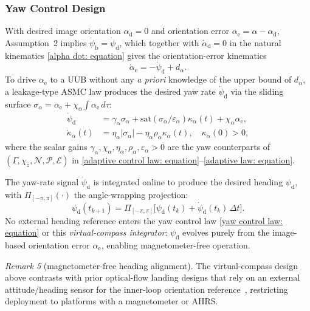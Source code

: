 \documentclass{IEEEtaes}
\begin{document}
\subsubsection{Yaw Control Design} \label{yaw control: section}
With desired image orientation $\alpha_\text{d}=0$ and orientation error $\alpha_\text{e}=\alpha-\alpha_\text{d}$, Assumption~2 implies $\dot{\psi}_\text{b}=\dot{\psi}_\text{d}$, which together with $\dot{\alpha}_\text{d}=0$ in the natural kinematics \eqref{alpha dot: equation} gives the orientation-error kinematics
\begin{equation} \label{alpha_e_dot: equation}
    \dot{\alpha}_\text{e} = -\dot{\psi}_\text{d} + d_{\alpha}.
\end{equation}
To drive $\alpha_\text{e}$ to a UUB without any \emph{a priori} knowledge of the upper bound of $d_{\alpha}$, a leakage-type ASMC law produces the desired yaw rate $\dot{\psi}_\text{d}$ via the sliding surface $\sigma_{\alpha}=\alpha_\text{e}+\chi_{\alpha}\!\int\alpha_\text{e}\,d\tau$:
\begin{align} \label{yaw control law: equation}
    \dot{\psi}_\text{d} &= \gamma_{\alpha}\sigma_{\alpha} + \text{sat}(\sigma_{\alpha}/\varepsilon_{\alpha})\kappa_{\alpha}(t) + \chi_{\alpha} \alpha_\text{e}, \nonumber\\
    \dot{\kappa}_{\alpha}(t) &= \eta_{\alpha}|\sigma_{\alpha}| - \eta_{\alpha}\rho_{\alpha}\kappa_{\alpha}(t),\quad\kappa_{\alpha}(0)>0,
\end{align}
where the scalar gains $\gamma_{\alpha}, \chi_{\alpha}, \eta_{\alpha}, \rho_{\alpha}, \varepsilon_{\alpha} > 0$ are the yaw counterparts of $(\Gamma,\chi_z,\mathcal{N},\mathcal{P},\mathcal{E})$ in \eqref{adaptive control law: equation}--\eqref{adaptive law: equation}.

The yaw-rate signal $\dot{\psi}_\text{d}$ is integrated online to produce the desired heading $\psi_\text{d}$, with $\Pi_{[-\pi,\pi]}(\cdot)$ the angle-wrapping projection:
\begin{equation} \label{psi d integrator: equation}
    \psi_\text{d}(t_{k+1}) = \Pi_{[-\pi,\pi]}\!\big[\psi_\text{d}(t_k) + \dot{\psi}_\text{d}(t_k)\,\Delta t\big].
\end{equation}
No external heading reference enters the yaw control law \eqref{yaw control law: equation} or this \emph{virtual-compass integrator}: $\psi_\text{d}$ evolves purely from the image-based orientation error $\alpha_\text{e}$, enabling magnetometer-free operation.

\textit{Remark 5} (magnetometer-free heading alignment). The virtual-compass design above contrasts with prior optical-flow landing designs that rely on an external attitude/heading sensor for the inner-loop orientation reference~\cite{herisse2012}, restricting deployment to platforms with a magnetometer or AHRS.
\end{document}
